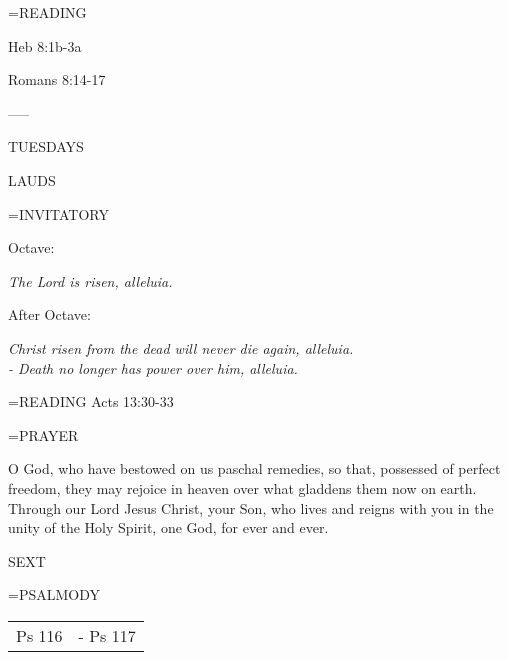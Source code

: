 \hangindent=\parindent \small READING
\begin{description}[labelindent=\parindent, leftmargin=*]
\item [1st-6th Week:]     Heb 8:1b-3a \textbf{    }
\item [7th Week:]     Romans 8:14-17 \textbf{    }
\end{description}

-----
\begin{center}
\normalsize TUESDAYS
\end{center}

\begin{flushleft}\normalsize LAUDS\\\end{flushleft}
\hangindent=\parindent \small{INVITATORY}
\begin{center}
\end{center}Octave:\begin{center}\textit{	The Lord is risen, alleluia.\\}
\end{center}After Octave:\begin{center}\textit{	Christ risen from the dead will never die again, alleluia.\\}
\textit{		- Death no longer has power over him, alleluia.\\}
\end{center}

\hangindent=\parindent \small{READING}    Acts 13:30-33 \textbf{   \\}

\hangindent=\parindent \small PRAYER
\begin{description}[labelindent=\parindent, noitemsep, leftmargin=*]
\item [Octave:] 	O God, who have bestowed on us paschal remedies, so that, possessed of perfect freedom, they may rejoice in heaven over what gladdens them now on earth. Through our Lord Jesus Christ, your Son, who lives and reigns with you in the unity of the Holy Spirit, one God, for ever and ever.
\item [After Octave:] 	
\end{description}

\begin{flushleft}\normalsize SEXT\\\end{flushleft}
\hangindent=\parindent \small{PSALMODY}
\begin{center}
\begin{tabular}{ l l }
Ps 116 &  - Ps 117\\
\end{tabular}
\end{center}		

